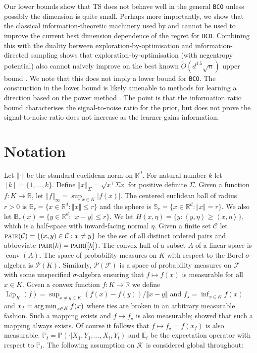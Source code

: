 \documentclass[letter, 12pt]{report}
\newcommand{\pair}{\operatorname{\textsc{pair}}}
\newcommand{\R}{\mathbb R}
\newcommand{\argmin}{\operatornamewithlimits{arg\,min}}
\newcommand{\ip}[1]{\left \langle #1 \right \rangle}
\newcommand{\sphere}{\mathbb{S}}
\newcommand{\ball}{\mathbb{B}}
\newcommand{\norm}[1]{\left \Vert  #1 \right \Vert}
\newcommand{\E}{\mathbb E}
\newcommand{\cK}{\mathcal K}
\newcommand{\cC}{\mathcal C}
\newcommand{\sF}{\mathscr F}
\newcommand{\sP}{\mathscr P}
\newcommand{\bbP}{\mathbb P}
\newcommand{\lip}{\operatorname{Lip}}
\newcommand{\conv}{\operatorname{conv}}
\newcommand{\1}{\mathbf{1}}
\newcommand{\bco}{\texttt{BCO}\xspace}
\newcommand{\ts}{\textsc{TS}\xspace}
\theoremstyle{plain}
\theoremstyle{definition}
\theoremstyle{remark}
\begin{document}
Our lower bounds show that \ts does not behave well in the general \bco unless possibly the dimension is quite small.
Perhaps more importantly, we show that the classical information-theoretic machinery used by \cite{BE18} and \cite{Lat20-cvx} cannot be used to improve the current
best dimension dependence of the regret for \bco.
Combining this with the duality between exploration-by-optimisation and information-directed sampling
shows that exploration-by-optimisation (with negentropy potential) also cannot naively improve on the best known $\tilde O(d^{1.5} \sqrt{n})$ upper bound \citep{ZL19,LG23}.
We note that this does not imply a lower bound for \bco.
The construction in the lower bound is likely amenable to methods for learning a direction based on the power method \citep{lattimore2021bandit,huang2021optimal}.
The point is that the information ratio bound characterises the signal-to-noise ratio for the prior, but does not prove the signal-to-noise ratio does not increase
as the learner gains information.

\section{Notation}
Let $\norm{\cdot}$ be the standard euclidean norm on $\R^d$.
For natural number $k$ let $[k] = \{1,\ldots,k\}$.
Define $\norm{x}_\Sigma = \sqrt{x^\top \Sigma x}$ for positive definite $\Sigma$.
Given a function $f : K \to \R$, let $\norm{f}_\infty = \sup_{x \in K} |f(x)|$.
The centered euclidean ball of radius $r > 0$ is $\ball_r = \{x \in \R^d : \norm{x} \leq r\}$ and
the sphere is $\sphere_r = \{x \in \R^d : \norm{x} = r\}$. We also let $\ball_r(x) = \{y \in \R^d : \norm{x - y} \leq r\}$.
We let $H(x, \eta) = \{y : \ip{y, \eta} \geq \ip{x, \eta}\}$, which is a half-space with inward-facing normal $\eta$.
Given a finite set $\cC$ let $\pair(\cC) = \{(x, y) \in \cC : x \neq y\}$ be the set of all distinct ordered pairs and abbreviate $\pair(k) = \pair([k])$.
The convex hull of a subset $A$ of a linear space is $\conv(A)$.
The space of probability measures on $K$ with respect to the Borel $\sigma$-algebra is $\sP(K)$.
Similarly, $\sP(\sF)$ is a space of probability measures on $\sF$ with some unspecified $\sigma$-algebra ensuring that $f \mapsto f(x)$
is measurable for all $x \in K$.
Given a convex function $f : K \to \R$ we define $\lip_K(f) = \sup_{x \neq y \in K} (f(x) - f(y)) / \norm{x - y}$
and $f_\star = \inf_{x \in K} f(x)$ and $x_f = \argmin_{x \in K} f(x)$ where ties are broken in an arbitrary measurable fashion.
Such a mapping exists and $f \mapsto f_\star$ is also measurable;
\cite{niemiro1992asymptotics} showed that such a mapping always exists.
Of course it follows that $f \mapsto f_\star = f(x_f)$ is also measurable.
$\bbP_t = \bbP(\cdot|X_1,Y_1,\ldots,X_t,Y_t)$ and $\E_t$ be the expectation operator with respect to $\bbP_t$.
The following assumption on $\cK$ is considered global throughout:
\end{document}
